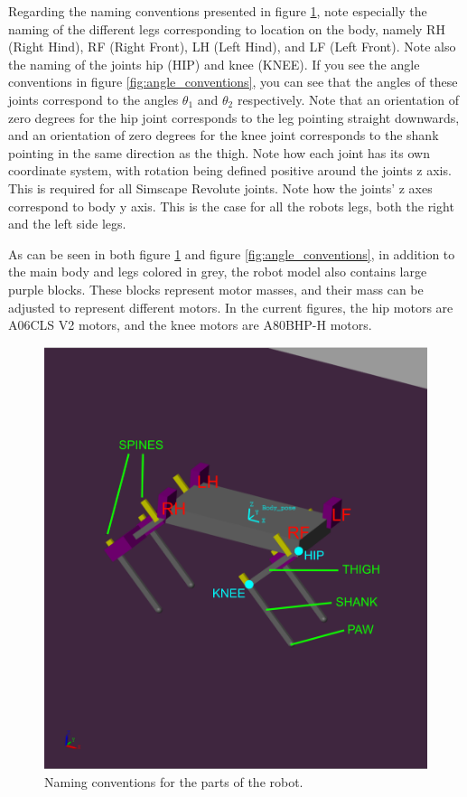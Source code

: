 Regarding the naming conventions presented in figure \ref{fig:name_conventions}, note especially the naming of the different legs corresponding to location on the body, namely RH (Right Hind), RF (Right Front), LH (Left Hind), and LF (Left Front). Note also the naming of the joints hip (HIP) and knee (KNEE). If you see the angle conventions in figure \ref{fig:angle_conventions}, you can see that the angles of these joints correspond to the angles $\theta_1$ and $\theta_2$ respectively. Note that an orientation of zero degrees for the hip joint corresponds to the leg pointing straight downwards, and an orientation of zero degrees for the knee joint corresponds to the shank pointing in the same direction as the thigh. Note how each joint has its own coordinate system, with rotation being defined positive around the joints z axis. This is required for all Simscape Revolute joints. Note how the joints' z axes correspond to body y axis. This is the case for all the robots legs, both the right and the left side legs. 


As can be seen in both figure \ref{fig:name_conventions} and figure \ref{fig:angle_conventions}, in addition to the main body and legs colored in grey, the robot model also contains large purple blocks. These blocks represent motor masses, and their mass can be adjusted to represent different motors. In the current figures, the hip motors are A06CLS V2 motors, and the knee motors are A80BHP-H motors. 

\begin{figure}
    \centering
    \includegraphics[width=\textwidth]{Images/naming_conventions.png}
    \caption{Naming conventions for the parts of the robot. }
    \label{fig:name_conventions}
\end{figure}

